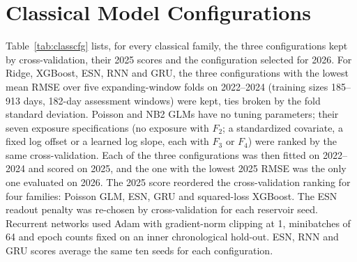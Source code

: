 \documentclass[journal]{IEEEtran}
\begin{document}
\section{Classical Model Configurations}
Table~\ref{tab:classcfg} lists, for every classical family, the three configurations kept by cross-validation, their 2025 scores and the configuration selected for 2026. For Ridge, XGBoost, ESN, RNN and GRU, the three configurations with the lowest mean RMSE over five expanding-window folds on 2022--2024 (training sizes 185--913 days, 182-day assessment windows) were kept, ties broken by the fold standard deviation. Poisson and NB2 GLMs have no tuning parameters; their seven exposure specifications (no exposure with $F_2$; a standardized covariate, a fixed log offset or a learned log slope, each with $F_3$ or $F_4$) were ranked by the same cross-validation. Each of the three configurations was then fitted on 2022--2024 and scored on 2025, and the one with the lowest 2025 RMSE was the only one evaluated on 2026. The 2025 score reordered the cross-validation ranking for four families: Poisson GLM, ESN, GRU and squared-loss XGBoost. The ESN readout penalty was re-chosen by cross-validation for each reservoir seed. Recurrent networks used Adam with gradient-norm clipping at 1, minibatches of 64 and epoch counts fixed on an inner chronological hold-out. ESN, RNN and GRU scores average the same ten seeds for each configuration.
\end{document}
